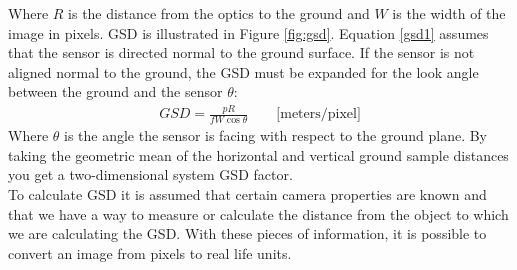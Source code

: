Where $R$ is the distance from the optics to the ground and $W$ is the width of the image in pixels. GSD is illustrated in Figure \ref{fig:gsd}. Equation \ref{gsd1} assumes that the sensor is directed normal to the ground surface. If the sensor is not aligned normal to the ground, the GSD must be expanded for the look angle between the ground and the sensor $\theta$:
\begin{align}
    GSD = \frac{pR}{fW\cos{\theta}}\quad\quad\textrm{[meters/pixel]}
    \label{gsd2}
\end{align}
Where $\theta$ is the angle the sensor is facing with respect to the ground plane. By taking the geometric mean of the horizontal and vertical ground sample distances you get a two-dimensional system GSD\cite{s} factor. \\

To calculate GSD it is assumed that certain camera properties are known and that we have a way to measure or calculate the distance from the object to which we are calculating the GSD. With these pieces of information, it is possible to convert an image from pixels to real life units.